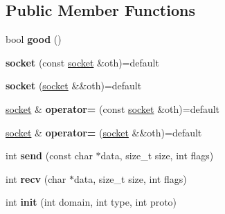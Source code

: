 \subsection*{Public Member Functions}
\begin{DoxyCompactItemize}
\item 
bool {\bfseries good} ()\hypertarget{structgxx_1_1inet_1_1socket_a574ed507e783d40ef441cf71a3f89f05}{}\label{structgxx_1_1inet_1_1socket_a574ed507e783d40ef441cf71a3f89f05}

\item 
{\bfseries socket} (const \hyperlink{structgxx_1_1inet_1_1socket}{socket} \&oth)=default\hypertarget{structgxx_1_1inet_1_1socket_a035f2e5d190567b033278365cb786744}{}\label{structgxx_1_1inet_1_1socket_a035f2e5d190567b033278365cb786744}

\item 
{\bfseries socket} (\hyperlink{structgxx_1_1inet_1_1socket}{socket} \&\&oth)=default\hypertarget{structgxx_1_1inet_1_1socket_af7d0dcb50eecf5bdc31b049596701856}{}\label{structgxx_1_1inet_1_1socket_af7d0dcb50eecf5bdc31b049596701856}

\item 
\hyperlink{structgxx_1_1inet_1_1socket}{socket} \& {\bfseries operator=} (const \hyperlink{structgxx_1_1inet_1_1socket}{socket} \&oth)=default\hypertarget{structgxx_1_1inet_1_1socket_ae8cd615d60979f2735f653b8c628e442}{}\label{structgxx_1_1inet_1_1socket_ae8cd615d60979f2735f653b8c628e442}

\item 
\hyperlink{structgxx_1_1inet_1_1socket}{socket} \& {\bfseries operator=} (\hyperlink{structgxx_1_1inet_1_1socket}{socket} \&\&oth)=default\hypertarget{structgxx_1_1inet_1_1socket_a09e6913d0acc9051df373191c9958775}{}\label{structgxx_1_1inet_1_1socket_a09e6913d0acc9051df373191c9958775}

\item 
int {\bfseries send} (const char $\ast$data, size\+\_\+t size, int flags)\hypertarget{structgxx_1_1inet_1_1socket_af1acab020711575172b6e44c993aac09}{}\label{structgxx_1_1inet_1_1socket_af1acab020711575172b6e44c993aac09}

\item 
int {\bfseries recv} (char $\ast$data, size\+\_\+t size, int flags)\hypertarget{structgxx_1_1inet_1_1socket_a37eca52184ced646189ad5f0c6e82a45}{}\label{structgxx_1_1inet_1_1socket_a37eca52184ced646189ad5f0c6e82a45}

\item 
int {\bfseries init} (int domain, int type, int proto)\hypertarget{structgxx_1_1inet_1_1socket_a683e1a4ed116958f02469a9c1ae7d33e}{}\label{structgxx_1_1inet_1_1socket_a683e1a4ed116958f02469a9c1ae7d33e}


\end{DoxyCompactItemize}
